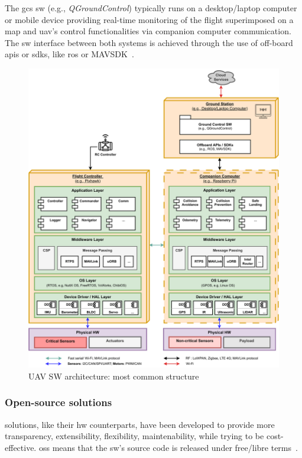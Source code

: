 The \gls{gcs} \gls{sw} (e.g., \emph{QGroundControl}) typically runs on a desktop/laptop computer or mobile
device providing real-time monitoring of the flight superimposed on a map and
\gls{uav}'s control functionalities via companion computer communication. The
\gls{sw} interface between both systems is achieved through the use of off-board
\glspl{api} or \glspl{sdk}, like \gls{ros} or MAVSDK~\cite{px4-sysArch}. 

\begin{figure}[!hbt]
  \centering
  \includegraphics[width=1.0\textwidth]{./img/pdf/uav-sw-arch.pdf} 
%   
  \caption{UAV SW architecture: most common structure}%
  \label{fig:uav-sw-arch}
\end{figure}

\subsubsection{Open-source solutions}%
\label{sec:open-source-solut-sw}
 solutions, like their \gls{hw} counterparts, have been
developed to provide more transparency, extensibility, flexibility,
maintenability, while trying to be cost-effective. \gls{oss} means that the
\gls{sw}'s source code is released under free/libre
terms~\cite{freeGNU}.

